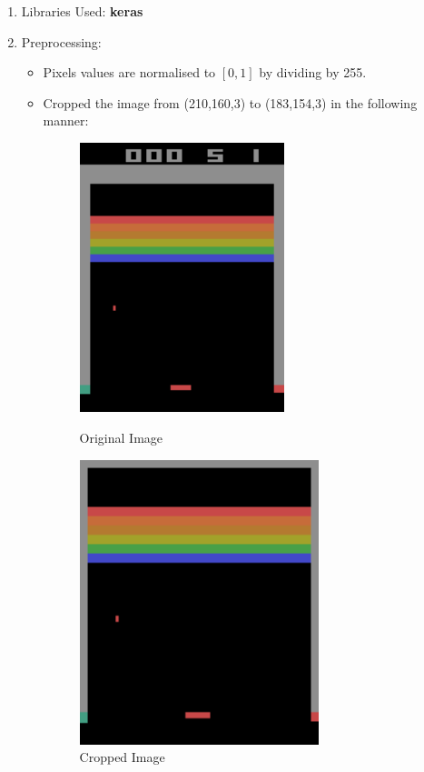 \documentclass[a4 paper]{article}
\begin{document}
\begin{enumerate}
    \item Libraries Used: \textbf{keras}
    \item Preprocessing:
    \begin{itemize}
        \item Pixels values are normalised to $[0,1]$ by dividing by 255.
        \item Cropped the image from (210,160,3) to (183,154,3) in the following manner:
        \begin{figure}[H]
            \centering
            \begin{minipage}[b]{0.4\textwidth}
              \includegraphics[width=0.6\textwidth]{extra/1.png}
              \caption{Original Image}
            \end{minipage}
            \hfill
            \begin{minipage}[b]{0.36\textwidth}
              \includegraphics[width=0.7\textwidth]{extra/2.png}
              \caption{Cropped Image}
            \end{minipage}
          \end{figure}          
    \end{itemize}


\end{enumerate}
\end{document}
